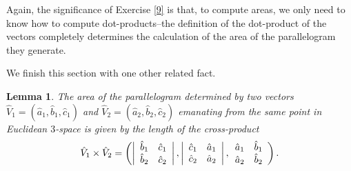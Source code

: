 \documentclass{article}%
\newtheorem{lemma}[theorem]{Lemma}
\begin{document}
Again, the significance of Exercise \ref{9} is that, to compute areas, we only
need to know how to compute dot-products--the definition of the dot-product of
the vectors completely determines the calculation of the area of the
parallelogram they generate.

We finish this section with one other related fact.

\begin{lemma}
The area of the parallelogram determined by two vectors $\hat{V}_{1}=\left(
\hat{a}_{1},\hat{b}_{1},\hat{c}_{1}\right)  $ and $\hat{V}_{2}=\left(  \hat
{a}_{2},\hat{b}_{2},\hat{c}_{2}\right)  $ emanating from the same point in
Euclidean $3$-space is given by the length of the cross-product%
\[
\hat{V}_{1}\times\hat{V}_{2}=\left(  \left\vert
\begin{array}
[c]{cc}%
\hat{b}_{1} & \hat{c}_{1}\\
\hat{b}_{2} & \hat{c}_{2}%
\end{array}
\right\vert ,\left\vert
\begin{array}
[c]{cc}%
\hat{c}_{1} & \hat{a}_{1}\\
\hat{c}_{2} & \hat{a}_{2}%
\end{array}
\right\vert ,%
\begin{array}
[c]{cc}%
\hat{a}_{1} & \hat{b}_{1}\\
\hat{a}_{2} & \hat{b}_{2}%
\end{array}
\right)  .
\]

\end{lemma}
\end{document}
